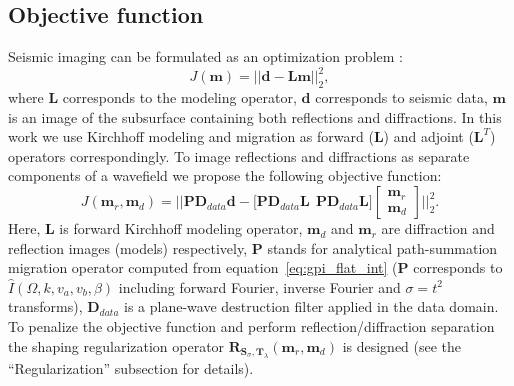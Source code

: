 \subsection{Objective function}

Seismic imaging can be formulated as an optimization problem \cite[]{Nemeth99,ronen2000least}:
\begin{equation}
\label{eq:general}
J(\mathbf{m}) = \big|\big|\mathbf{d} - \mathbf{L}\mathbf{m}\big|\big|_{2}^{2},
\end{equation}
where $\mathbf{L}$ corresponds to the modeling operator, $\mathbf{d}$ corresponds to seismic data,
$\mathbf{m}$ is an image of the subsurface containing both reflections and diffractions. In this work we
use Kirchhoff modeling and migration as forward ($\mathbf{L}$) and adjoint ($\mathbf{L}^T$) operators correspondingly. To image reflections and diffractions
as separate components of a wavefield we propose the following objective function: 
\begin{equation}
\label{eq:chain2d}
J(\mathbf{m}_r,\mathbf{m}_d) = \Bigg|\Bigg| \mathbf{PD}_{data} \mathbf{d} - \bigg[ \mathbf{P}\mathbf{D}_{data}\mathbf{L}\ \ \mathbf{P}\mathbf{D}_{data} \mathbf{L} \bigg] \begin{bmatrix} \mathbf{m}_r\\ \mathbf{m}_d \end{bmatrix} \Bigg|\Bigg|_{2}^{2}.
\end{equation}
Here, $\mathbf{L}$ is forward Kirchhoff modeling operator, $\mathbf{m}_d$
and $\mathbf{m}_r$ are diffraction and reflection images (models) respectively, $\mathbf{P}$ stands for analytical path-summation migration
operator computed from equation~\ref{eq:gpi_flat_int} ($\mathbf{P}$ corresponds to $\hat{I}(\Omega,k,v_a,v_b,\beta)$ including forward Fourier, inverse
Fourier and $\sigma=t^2$ transforms), $\mathbf{D}_{data}$ is a plane-wave
destruction filter applied in the data domain.
To penalize the objective function and perform reflection/diffraction separation the shaping regularization operator $\mathbf{R}_{\mathbf{S}_{\sigma},\mathbf{T}_{\lambda}}(\mathbf{m}_r,\mathbf{m}_d)$ is designed (see the ``Regularization'' subsection for details).

